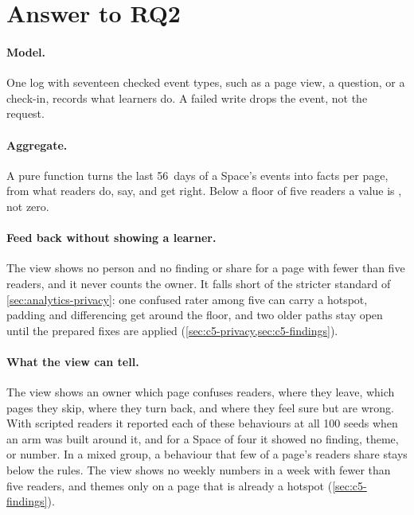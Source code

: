 \section{Answer to RQ2}
\label{sec:c5-answer}

\paragraph{Model.} One log with seventeen checked event types, such as a page
view, a question, or a check-in, records what learners do. A failed write
drops the event, not the request.

\paragraph{Aggregate.} A pure function turns the last 56~days of a Space's
events into facts per page, from what readers do, say, and get right. Below a
floor of five readers a value is , not zero.

\paragraph{Feed back without showing a learner.} The view shows no person and
no finding or share for a page with fewer than five readers, and it never
counts the owner. It falls short of the stricter standard of
\cref{sec:analytics-privacy}: one confused rater among five can carry a
hotspot, padding and differencing get around the floor, and two older paths
stay open until the prepared fixes are applied
(\cref{sec:c5-privacy,sec:c5-findings}).

\paragraph{What the view can tell.} The view shows an owner which page
confuses readers, where they leave, which pages they skip, where they turn
back, and where they feel sure but are wrong. With scripted readers it
reported each of these behaviours at all 100 seeds when an arm was
built around it, and for a Space of four it showed no finding, theme, or number. In a mixed group,
a behaviour that few of a page's readers share stays below the rules. The view
shows no weekly numbers in a week with fewer than five readers, and themes
only on a page that is already a hotspot (\cref{sec:c5-findings}).
